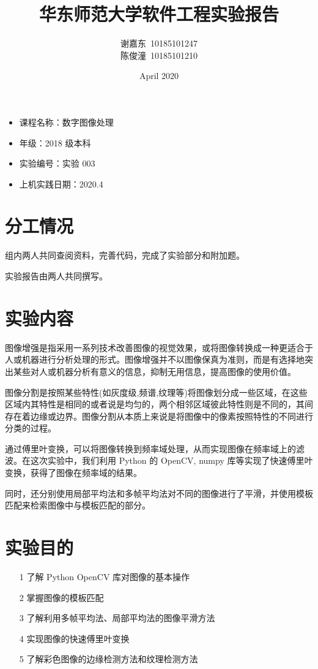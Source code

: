 \documentclass[11pt]{ctexart}
\title{华东师范大学软件工程实验报告}
\author{谢嘉东\ 10185101247\\陈俊潼\ 10185101210}
\date{April 2020}
\begin{document}
\maketitle

\thispagestyle{empty}

\begin{itemize}
    \item 课程名称：数字图像处理
    \item 年级：2018 级本科
    \item 实验编号：实验 003
    \item 上机实践日期：2020.4
\end{itemize}

\tableofcontents

\thispagestyle{empty}

\newpage

\section{分工情况}

组内两人共同查阅资料，完善代码，完成了实验部分和附加题。

实验报告由两人共同撰写。

\section{实验内容}

图像增强是指采用一系列技术改善图像的视觉效果，或将图像转换成一种更适合于人或机器进行分析处理的形式。图像增强并不以图像保真为准则，而是有选择地突出某些对人或机器分析有意义的信息，抑制无用信息，提高图像的使用价值。

图像分割是按照某些特性(如灰度级,频谱,纹理等)将图像划分成一些区域，在这些区域内其特性是相同的或者说是均匀的，两个相邻区域彼此特性则是不同的，其间存在着边缘或边界。图像分割从本质上来说是将图像中的像素按照特性的不同进行分类的过程。

通过傅里叶变换，可以将图像转换到频率域处理，从而实现图像在频率域上的滤波。在这次实验中，我们利用 Python 的 OpenCV, numpy 库等实现了快速傅里叶变换，获得了图像在频率域的结果。

同时，还分别使用局部平均法和多帧平均法对不同的图像进行了平滑，并使用模板匹配来检索图像中与模板匹配的部分。


\section{实验目的}

\begin{itemize}
    \item [1] 了解 Python OpenCV 库对图像的基本操作
    \item [2] 掌握图像的模板匹配
    \item [3] 了解利用多帧平均法、局部平均法的图像平滑方法
    \item [4] 实现图像的快速傅里叶变换
    \item [5] 了解彩色图像的边缘检测方法和纹理检测方法
\end{itemize}
\end{document}
